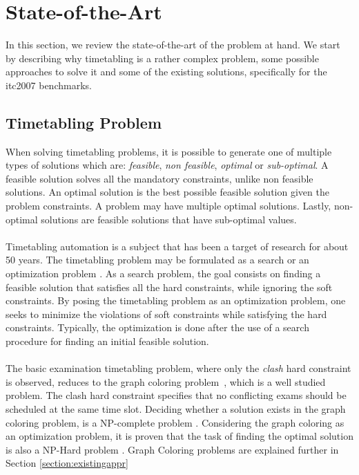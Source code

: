\chapter{State-of-the-Art}
\label{stateofart}
\thispagestyle{plain}

In this section, we review the state-of-the-art of the problem at hand. We start by describing why timetabling is a rather complex problem, some possible approaches to solve it and some of the existing solutions, specifically for the \gls{itc2007} benchmarks.\\

\section{Timetabling Problem}

When solving timetabling problems, it is possible to generate one of multiple types of solutions which are: \textit{feasible}, \textit{non feasible}, \textit{optimal} or \textit{sub-optimal}. A feasible solution solves all the mandatory constraints, unlike non feasible solutions. An optimal solution is the best possible feasible solution given the problem constraints. A problem may have multiple optimal solutions. Lastly, non-optimal solutions are feasible solutions that have sub-optimal values.\\
\\
Timetabling automation is a subject that has been a target of research for about 50 years. The timetabling problem may be formulated as a search or an optimization problem \cite{Schaerf1999}. As a search problem, the goal consists on finding a feasible solution that satisfies all the hard constraints, while ignoring the soft constraints. By posing the timetabling problem as an optimization problem, one seeks to minimize the violations of soft constraints while satisfying the hard constraints. Typically, the optimization is done after the use of a search procedure for finding an initial feasible solution.\\
\\
The basic examination timetabling problem, where only the \textit{clash} hard constraint is observed, reduces to the graph coloring problem~\cite{Jensen2001}, which is a well studied problem. The clash hard constraint specifies that no conflicting exams should be scheduled at the same time slot. Deciding whether a solution exists in the graph coloring problem, is a NP-complete \cite{Arora2009} problem \cite{Qu2009}. Considering the graph coloring as an optimization problem, it is proven that the task of finding the optimal solution is also a NP-Hard \cite{Arora2009} problem \cite{Qu2009}. Graph Coloring problems are explained further in Section \ref{section:existingappr}
\\
